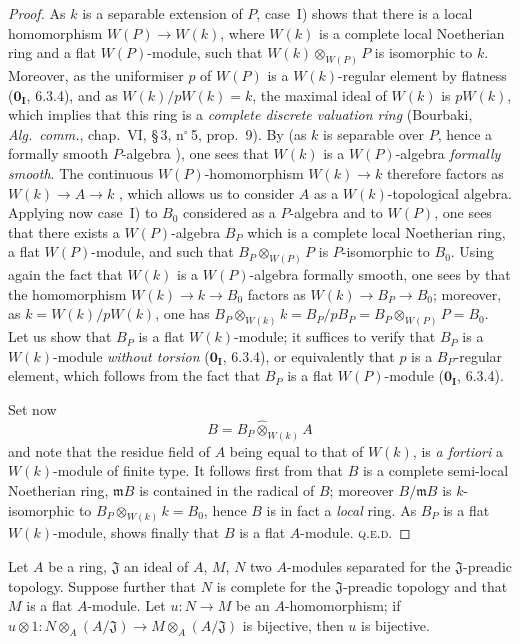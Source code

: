 \begin{proof}
As $k$ is a separable extension of $P$, case~I) shows that there is a local homomorphism $W(P)\to W(k)$, where $W(k)$ is a complete local Noetherian ring and a flat $W(P)$-module, such that $W(k)\otimes_{W(P)}P$ is isomorphic to $k$.
Moreover, as the uniformiser $p$ of $W(P)$ is a $W(k)$-regular element by flatness ($\mathbf{0_I}$, 6.3.4), and as $W(k)/pW(k)=k$, the maximal ideal of $W(k)$ is $pW(k)$, which implies that this ring is a \emph{complete discrete valuation ring} (Bourbaki, \emph{Alg.\ comm.}, chap.~VI, \S\,3, n$^\circ$\,5, prop.~9).
By  (as $k$ is separable over $P$, hence a formally smooth $P$-algebra ), one sees that $W(k)$ is a $W(P)$-algebra \emph{formally smooth}.
The continuous $W(P)$-homomorphism $W(k)\to k$ therefore factors as $W(k)\to A\to k$ ,
which allows us to consider $A$ as a $W(k)$-topological algebra.
Applying now case~I) to $B_0$ considered as a $P$-algebra and to $W(P)$, one sees that there exists a $W(P)$-algebra $B_P$ which is a complete local Noetherian ring, a flat $W(P)$-module, and such that $B_P\otimes_{W(P)}P$ is $P$-isomorphic to $B_0$.
Using again the fact that $W(k)$ is a $W(P)$-algebra formally smooth, one sees by  that the homomorphism $W(k)\to k\to B_0$ factors as $W(k)\to B_P\to B_0$; moreover, as $k=W(k)/pW(k)$, one has $B_P\otimes_{W(k)}k = B_P/pB_P = B_P\otimes_{W(P)}P = B_0$.
Let us show that $B_P$ is a flat $W(k)$-module; it suffices to verify that $B_P$ is a $W(k)$-module \emph{without torsion} ($\mathbf{0_I}$, 6.3.4), or equivalently that $p$ is a $B_P$-regular element, which follows from the fact that $B_P$ is a flat $W(P)$-module ($\mathbf{0_I}$, 6.3.4).

Set now
\[
  B = B_P\widehat{\otimes}_{W(k)} A
\]
and note that the residue field of $A$ being equal to that of $W(k)$, is \emph{a fortiori} a $W(k)$-module of finite type.
It follows first from  that $B$ is a complete semi-local Noetherian ring, $\mathfrak{m}B$ is contained in the radical of $B$; moreover $B/\mathfrak{m}B$ is $k$-isomorphic to $B_P\otimes_{W(k)}k = B_0$, hence $B$ is in fact a \emph{local} ring.
As $B_P$ is a flat $W(k)$-module,  shows finally that $B$ is a flat $A$-module. \textsc{q.e.d.}
\end{proof}

\begin{lemma}[19.7.1.4]
\label{0.19.7.1.4}
Let $A$ be a ring, $\mathfrak{J}$ an ideal of $A$, $M$, $N$ two $A$-modules separated for the $\mathfrak{J}$-preadic topology.
Suppose further that $N$ is complete for the $\mathfrak{J}$-preadic topology and that $M$ is a flat $A$-module.
Let $u:N\to M$ be an $A$-homomorphism; if $u\otimes 1:N\otimes_A(A/\mathfrak{J})\to M\otimes_A(A/\mathfrak{J})$ is bijective, then $u$ is bijective.
\end{lemma}

